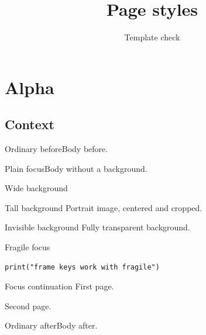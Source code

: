 \documentclass[language=english,cjk=false]{campusbeamer}
\title{Page styles}
\author{Template check}
\begin{document}
\section{Alpha}
\subsection{Context}
\begin{frame}{Ordinary before}Body before.\end{frame}
\begin{frame}[campusfocus]{Plain focus}Body without a background.\end{frame}
\begin{frame}[campusbackground=build/style-wide.pdf,campusbackgroundopacity=1]{Wide background}
  \par
\end{frame}
\begin{frame}[campusbackgroundopacity=.5,campusbackground=build/style-tall.pdf]{Tall background}
  Portrait image, centered and cropped.
\end{frame}
\begin{frame}[campusbackground=build/style-wide.pdf,campusbackgroundopacity=0]{Invisible background}
  Fully transparent background.
\end{frame}
\begin{frame}{Fragile focus}
\begin{verbatim}
print("frame keys work with fragile")
\end{verbatim}
\end{frame}
\begin{frame}{Focus continuation}
First page.\par\framebreak
Second page.
\end{frame}
\begin{frame}{Ordinary after}Body after.\end{frame}
\end{document}

